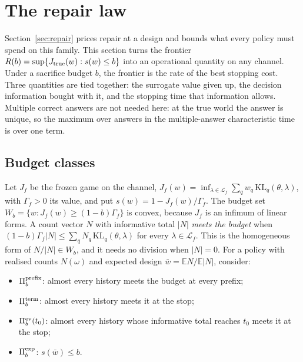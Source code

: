 
\section{The repair law}
\label{sec:repairlaw}

Section~\ref{sec:repair} prices repair at a design and bounds what every policy must spend on
this family. This section turns the frontier $R(b)=\sup\{J_{\rm true}(w):s(w)\le b\}$ into an
operational quantity on any channel. Under a sacrifice budget $b$, the frontier is the rate
of the best stopping cost. Three quantities are tied together: the surrogate value given up,
the decision information bought with it, and the stopping time that information allows.
Multiple correct answers are not needed here: at the true world the answer is unique, so the
maximum over answers in the multiple-answer characteristic time~\cite{degenne2019} is over one
term.

\subsection{Budget classes}
Let $J_f$ be the frozen game on the channel,
$J_f(w)=\inf_{\lambda\in\mathcal L_f}\sum_qw_q\,\mathrm{KL}_q(\theta,\lambda)$, with
$\Gamma_f>0$ its value, and put $s(w)=1-J_f(w)/\Gamma_f$. The budget set
$W_b=\{w:J_f(w)\ge(1-b)\Gamma_f\}$ is convex, because $J_f$ is an infimum of linear forms.
A count vector $N$ with informative total $|N|$ \emph{meets the budget} when
$(1-b)\Gamma_f|N|\le\sum_qN_q\,\mathrm{KL}_q(\theta,\lambda)$ for every
$\lambda\in\mathcal L_f$. This is the homogeneous form of $N/|N|\in W_b$, and it needs no
division when $|N|=0$. For a policy with realised counts $N(\omega)$ and expected design
$\bar w=\mathbb EN/\mathbb E|N|$, consider:
\begin{itemize}
\item $\Pi_b^{\rm prefix}$: almost every history meets the budget at every prefix;
\item $\Pi_b^{\rm term}$: almost every history meets it at the stop;
\item $\Pi_b^{\rm ev}(t_0)$: almost every history whose informative total reaches $t_0$ meets it
at the stop;
\item $\Pi_b^{\rm exp}$: $s(\bar w)\le b$.
\end{itemize}

